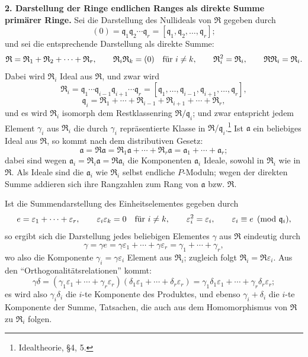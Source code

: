 \documentclass[11pt]{article}
\begin{document}
\textbf{2. Darstellung der Ringe endlichen Ranges als direkte Summe primärer Ringe.} Sei die Darstellung des Nullideals von $\mathfrak R$ gegeben durch
\[
   (0)=\mathfrak q_1\mathfrak q_2\cdots\mathfrak q_r
      =[\mathfrak q_1,\mathfrak q_2,\ldots,\mathfrak q_r];
\]
und sei die entsprechende Darstellung als direkte Summe:
\[
   \mathfrak R=\mathfrak R_1+\mathfrak R_2+\cdots+\mathfrak R_r,
   \qquad
   \mathfrak R_i\mathfrak R_k=(0)\quad\hbox{für } i\ne k,
   \qquad
   \mathfrak R_i^2=\mathfrak R_i,
   \qquad
   \mathfrak R\mathfrak R_i=\mathfrak R_i.
\]
Dabei wird $\mathfrak R_i$ Ideal aus $\mathfrak R$, und zwar wird
\[
   \mathfrak R_i
   =\mathfrak q_1\cdots\mathfrak q_{i-1}\mathfrak q_{i+1}\cdots\mathfrak q_r
   =[\mathfrak q_1,\ldots,\mathfrak q_{i-1},\mathfrak q_{i+1},\ldots,\mathfrak q_r],
\]
\[
   \mathfrak q_i=\mathfrak R_1+\cdots+\mathfrak R_{i-1}+\mathfrak R_{i+1}+\cdots+\mathfrak R_r,
\]
und es wird $\mathfrak R_i$ isomorph dem Restklassenring $\mathfrak R/\mathfrak q_i$; und zwar entspricht jedem Element $\gamma_i$ aus $\mathfrak R_i$ die durch $\gamma_i$ repräsentierte Klasse in $\mathfrak R/\mathfrak q_i$.\footnote{Idealtheorie, \S 4, 5.} Ist $\mathfrak a$ ein beliebiges Ideal aus $\mathfrak R$, so kommt nach dem distributiven Gesetz:
\[
   \mathfrak a=\mathfrak R\mathfrak a
   =\mathfrak R_1\mathfrak a+\cdots+\mathfrak R_r\mathfrak a
   =\mathfrak a_1+\cdots+\mathfrak a_r;
\]
dabei sind wegen $\mathfrak a_i=\mathfrak R_i\mathfrak a=\mathfrak R\mathfrak a_i$ die Komponenten $\mathfrak a_i$ Ideale, sowohl in $\mathfrak R_i$ wie in $\mathfrak R$. Als Ideale sind die $\mathfrak a_i$ wie $\mathfrak R_i$ selbst endliche $P$-Moduln; wegen der direkten Summe addieren sich ihre Rangzahlen zum Rang von $\mathfrak a$ bzw. $\mathfrak R$.

Ist die Summendarstellung des Einheitselementes gegeben durch
\[
   e=\varepsilon_1+\cdots+\varepsilon_r,
   \qquad
   \varepsilon_i\varepsilon_k=0\quad\hbox{für } i\ne k,
   \qquad
   \varepsilon_i^2=\varepsilon_i,
   \qquad
   \varepsilon_i\equiv e\pmod{\mathfrak q_i},
\]
so ergibt sich die Darstellung jedes beliebigen Elementes $\gamma$ aus $\mathfrak R$ eindeutig durch
\[
   \gamma=\gamma e=\gamma\varepsilon_1+\cdots+\gamma\varepsilon_r
      =\gamma_1+\cdots+\gamma_r,
\]
wo also die Komponente $\gamma_i=\gamma\varepsilon_i$ Element aus $\mathfrak R_i$; zugleich folgt $\mathfrak R_i=\mathfrak R\varepsilon_i$. Aus den ``Orthogonalitätsrelationen'' kommt:
\[
   \gamma\delta=(\gamma_1\varepsilon_1+\cdots+\gamma_r\varepsilon_r)
      (\delta_1\varepsilon_1+\cdots+\delta_r\varepsilon_r)
   =\gamma_1\delta_1\varepsilon_1+\cdots+\gamma_r\delta_r\varepsilon_r;
\]
es wird also $\gamma_i\delta_i$ die $i$-te Komponente des Produktes, und ebenso $\gamma_i+\delta_i$ die $i$-te Komponente der Summe, Tatsachen, die auch aus dem Homomorphismus von $\mathfrak R$ zu $\mathfrak R_i$ folgen.
\end{document}

